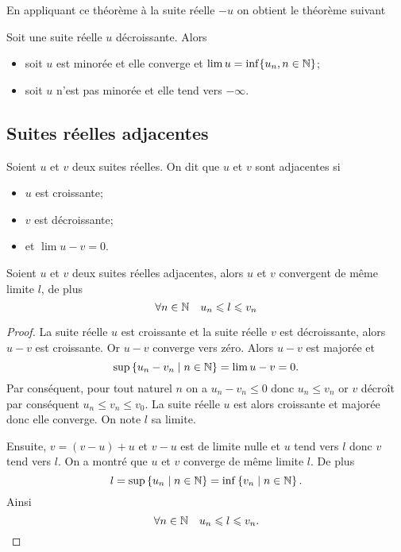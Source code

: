 En appliquant ce théorème à la suite réelle $-u$ on obtient le théorème suivant
\begin{theo}
  Soit une suite réelle $u$ décroissante. Alors
  \begin{itemize}
  \item soit $u$ est minorée et elle converge et $\lim u = \inf\{u_n, n \in \mathbb{N}\}$;
  \item soit $u$ n'est pas minorée et elle tend vers $-\infty$.
  \end{itemize}
\end{theo}

\subsection{Suites réelles adjacentes}

\begin{defdef}
  Soient $u$ et $v$ deux suites réelles. On dit que $u$ et $v$ sont adjacentes si
  \begin{itemize}
  \item $u$ est croissante;
  \item $v$ est décroissante;
  \item et $\lim u-v =0$.
  \end{itemize}
\end{defdef}
\begin{prop}
  Soient $u$ et $v$ deux suites réelles adjacentes, alors $u$ et $v$ convergent de même limite $l$, de plus
  \begin{equation}
    \forall n \in \mathbb{N} \quad u_n \leqslant l \leqslant v_n
  \end{equation}
\end{prop}
\begin{proof}
  La suite réelle $u$ est croissante et la suite réelle $v$ est décroissante, alors $u-v$ est croissante. Or $u-v$ converge vers zéro. Alors $u-v$ est majorée et
  \begin{equation}
    \sup\left\{u_n-v_n\mathrel{}\middle|\mathrel{}n \in \mathbb{N}\right\}=\lim u-v=0.
  \end{equation}
Par conséquent, pour tout naturel $n$ on a $u_n-v_n \leqslant 0$ donc $u_n \leqslant v_n$ or $v$ décroît par conséquent $u_n \leqslant v_n \leqslant v_0$. La suite réelle $u$ est alors croissante et majorée donc elle converge. On note $l$ sa limite. 

Ensuite, $v=(v-u)+u$ et $v-u$ est de limite nulle et $u$ tend vers $l$ donc $v$ tend vers $l$. On a montré que $u$ et $v$ converge de même limite $l$. De plus
\begin{equation}
  l=\sup\left\{u_n\mathrel{}\middle|\mathrel{}n\in \mathbb{N}\right\}=\inf\left\{v_n\mathrel{}\middle|\mathrel{}n\in \mathbb{N}\right\}.
\end{equation}
Ainsi
\begin{equation}
  \forall n \in \mathbb{N} \quad u_n \leqslant l \leqslant v_n.
\end{equation}
\end{proof}

